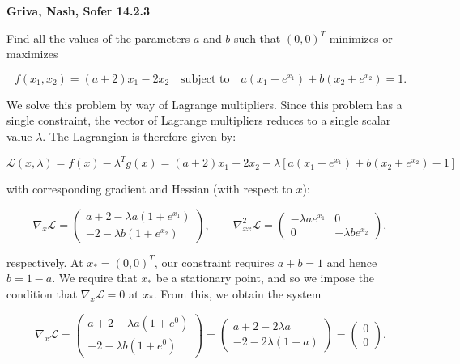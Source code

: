 \textbf{Griva, Nash, Sofer 14.2.3}

Find all the values of the parameters $a$ and $b$ such that $(0, 0)^T$ minimizes or maximizes

$$
f(x_1, x_2) = (a + 2)x_1 - 2x_2
\quad \text{subject to} \quad 
a \left(x_1 + e^{x_1} \right) + b \left(x_2 + e^{x_2} \right) = 1.
$$


\begin{solution}
    We solve this problem by way of Lagrange multipliers. Since this problem has a single constraint, the vector of 
    Lagrange multipliers reduces to a single scalar value $\lambda$. The Lagrangian is therefore given by:

    $$
    \mathcal{L}(x, \lambda) = f(x) - \lambda^T g(x) = (a + 2)x_1 - 2x_2 - \lambda \left[a \left(x_1 + e^{x_1} \right) + b \left(x_2 + e^{x_2} \right) - 1 \right]
    $$

    with corresponding gradient and Hessian (with respect to $x$):

    $$
    \nabla_x \mathcal{L} = \begin{pmatrix*}
        a + 2 - \lambda a \left(1 + e^{x_1} \right) \\
        -2 - \lambda b \left(1 + e^{x_2} \right)
    \end{pmatrix*}, \qquad \nabla^2_{xx} \mathcal{L} = \begin{pmatrix*}
        -\lambda a e^{x_1} & 0 \\
        0                  & -\lambda b e^{x_2}
    \end{pmatrix*},
    $$

    respectively. At $x_* = (0, 0)^T$, our constraint requires $a + b = 1$ and hence $b = 1 - a$. We require that $x_*$
    be a stationary point, and so we impose the condition that $\nabla_x \mathcal{L} = 0$ at $x_*$. From this, we 
    obtain the system

    $$
    \nabla_x \mathcal{L} = \begin{pmatrix*}
        a + 2 - \lambda a \left(1 + e^{0} \right) \\
        -2 - \lambda b \left(1 + e^{0} \right)
    \end{pmatrix*} = \begin{pmatrix*}
        a + 2 - 2 \lambda a \\
        -2 - 2 \lambda (1 - a)
    \end{pmatrix*} = \begin{pmatrix*}
        0 \\
        0
    \end{pmatrix*}.
    $$


\end{solution}
